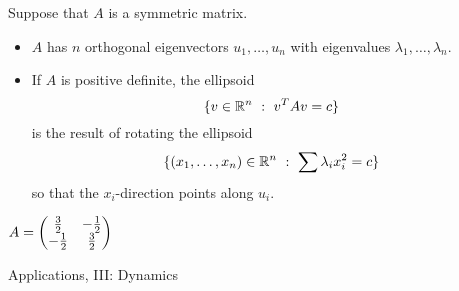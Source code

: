 \documentclass{beamer}
\begin{document}
\begin{frame}
\begin{Theorem}\label{thm:spectral}
Suppose that \(A\) is a symmetric matrix.
\begin{itemize}
\item <2-> \(A\) has \(n\) orthogonal eigenvectors \(u_1,\ldots,u_n\)
with eigenvalues \(\lambda_1,\ldots,\lambda_n\).
\item <3-> If \(A\) is positive definite, the ellipsoid \[\{v\in\mathbb{R}^n\ :\
v^TAv=c\}\] is the result of rotating the ellipsoid
\[\{(x_1,\ldots,x_n)\in\mathbb{R}^n\ :\ \sum \lambda_ix_i^2=c\}\] so that
the \(x_i\)-direction points along \(u_i\).


\end{itemize}
\end{Theorem}
\begin{Example}
\(A=\begin{pmatrix} \frac{3}{2} & -\frac{1}{2} \\ -\frac{1}{2} & \frac{3}{2}\end{pmatrix}\)


\end{Example}
\end{frame}
\begin{frame}
\begin{center}
{\huge Applications, III: Dynamics}
\end{center}


\end{frame}
\end{document}
